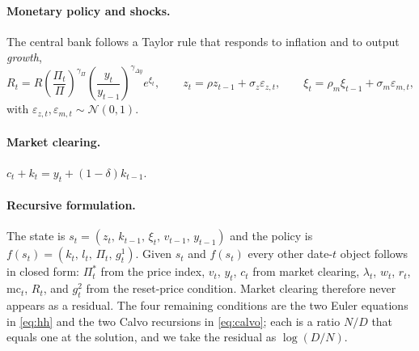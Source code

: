 \documentclass[11pt]{article}
\begin{document}
\paragraph{Monetary policy and shocks.} The central bank follows a Taylor rule that responds to inflation and to output \emph{growth},
\begin{equation}
R_t = R \left( \frac{\Pi_t}{\Pi} \right)^{\gamma_\Pi} \left( \frac{y_t}{y_{t-1}} \right)^{\gamma_{\Delta y}} e^{\xi_t},
\qquad
z_t = \rho z_{t-1} + \sigma_z \varepsilon_{z,t}, \qquad
\xi_t = \rho_m \xi_{t-1} + \sigma_m \varepsilon_{m,t},
\label{eq:taylor}
\end{equation}
with $\varepsilon_{z,t}, \varepsilon_{m,t} \sim \mathcal{N}(0,1)$. 

\paragraph{Market clearing.} $c_t + k_t = y_t + (1-\delta) k_{t-1}$.

\paragraph{Recursive formulation.} The state is $s_t = (z_t,\, k_{t-1},\, \xi_t,\, v_{t-1},\, y_{t-1})$ and the policy is $f(s_t) = (k_t,\, l_t,\, \Pi_t,\, g^1_t)$. Given $s_t$ and $f(s_t)$ every other date-$t$ object follows in closed form: $\Pi^*_t$ from the price index, $v_t$, $y_t$, $c_t$ from market clearing, $\lambda_t$, $w_t$, $r_t$, $\mathrm{mc}_t$, $R_t$, and $g^2_t$ from the reset-price condition. Market clearing therefore never appears as a residual. The four remaining conditions are the two Euler equations in \eqref{eq:hh} and the two Calvo recursions in \eqref{eq:calvo}; each is a ratio $N/D$ that equals one at the solution, and we take the residual as $\log(D/N)$.
\end{document}
